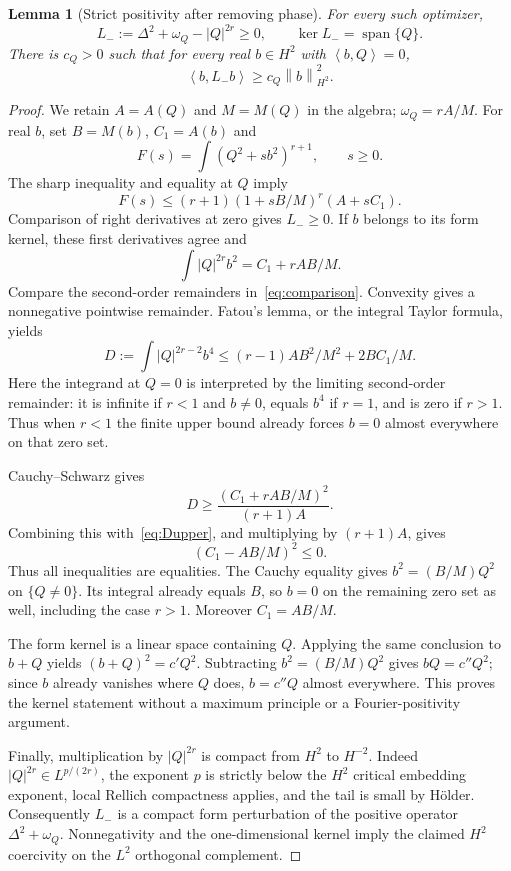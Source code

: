 \documentclass[11pt,a4paper]{article}
\newtheorem{lemma}[theorem]{Lemma}
\theoremstyle{remark}\newtheorem{remark}[theorem]{Remark}
\newcommand{\norm}[1]{\left\|#1\right\|}
\newcommand{\ip}[2]{\left\langle #1,#2\right\rangle}
\begin{document}
\begin{lemma}[Strict positivity after removing phase]\label{lem:coercivity}
For every such optimizer,
\[
 L_-:=\Delta^2+\omega_Q-|Q|^{2r}\ge0,\qquad
 \ker L_-=\operatorname{span}\{Q\}.
\]
There is $c_Q>0$ such that for every real $b\in H^2$ with $\ip bQ=0$,
\[
 \ip b{L_-b}\ge c_Q\norm b_{H^2}^2.
\]
\end{lemma}
\begin{proof}
We retain $A=A(Q)$ and $M=M(Q)$ in the algebra; $\omega_Q=rA/M$. For real $b$, set $B=M(b)$, $C_1=A(b)$ and
\[
 F(s)=\int(Q^2+s b^2)^{r+1},\qquad s\ge0.
\]
The sharp inequality and equality at $Q$ imply
\begin{equation}\label{eq:comparison}
 F(s)\le (r+1)(1+sB/M)^r(A+sC_1).
\end{equation}
Comparison of right derivatives at zero gives $L_-\ge0$. If $b$ belongs to its form kernel, these first derivatives agree and
\[
 \int |Q|^{2r}b^2=C_1+rAB/M.
\]
Compare the second-order remainders in~\eqref{eq:comparison}. Convexity gives a nonnegative pointwise remainder. Fatou's lemma, or the integral Taylor formula, yields
\begin{equation}\label{eq:Dupper}
 D:=\int |Q|^{2r-2}b^4
 \le (r-1)AB^2/M^2+2BC_1/M.
\end{equation}
Here the integrand at $Q=0$ is interpreted by the limiting second-order remainder: it is infinite if $r<1$ and $b\ne0$, equals $b^4$ if $r=1$, and is zero if $r>1$. Thus when $r<1$ the finite upper bound already forces $b=0$ almost everywhere on that zero set.

Cauchy--Schwarz gives
\[
 D\ge\frac{(C_1+rAB/M)^2}{(r+1)A}.
\]
Combining this with~\eqref{eq:Dupper}, and multiplying by $(r+1)A$, gives
\[
 (C_1-AB/M)^2\le0.
\]
Thus all inequalities are equalities. The Cauchy equality gives $b^2=(B/M)Q^2$ on $\{Q\ne0\}$. Its integral already equals $B$, so $b=0$ on the remaining zero set as well, including the case $r>1$. Moreover $C_1=AB/M$.

The form kernel is a linear space containing $Q$. Applying the same conclusion to $b+Q$ yields $(b+Q)^2=c'Q^2$. Subtracting $b^2=(B/M)Q^2$ gives $bQ=c''Q^2$; since $b$ already vanishes where $Q$ does, $b=c''Q$ almost everywhere. This proves the kernel statement without a maximum principle or a Fourier-positivity argument.

Finally, multiplication by $|Q|^{2r}$ is compact from $H^2$ to $H^{-2}$. Indeed $|Q|^{2r}\in L^{p/(2r)}$, the exponent $p$ is strictly below the $H^2$ critical embedding exponent, local Rellich compactness applies, and the tail is small by H\"older. Consequently $L_-$ is a compact form perturbation of the positive operator $\Delta^2+\omega_Q$. Nonnegativity and the one-dimensional kernel imply the claimed $H^2$ coercivity on the $L^2$ orthogonal complement.
\end{proof}
\end{document}

